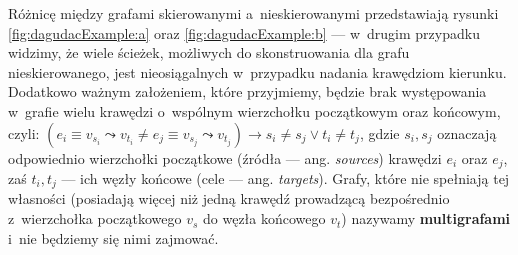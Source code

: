 Różnicę między grafami skierowanymi a~nieskierowanymi przedstawiają rysunki \ref{fig:dagudacExample:a} oraz \ref{fig:dagudacExample:b} --- w~drugim przypadku widzimy, że wiele ścieżek, możliwych do skonstruowania dla grafu nieskierowanego, jest nieosiągalnych w~przypadku nadania krawędziom kierunku.
Dodatkowo ważnym założeniem, które przyjmiemy, będzie brak występowania w~grafie wielu krawędzi o~wspólnym wierzchołku początkowym oraz końcowym, czyli: $\left( e_{i} \equiv v_{s_{i}} \leadsto v_{t_{i}} \neq e_{j} \equiv v_{s_{j}} \leadsto v_{t_{j}} \right) \rightarrow s_{i} \neq s_{j} \vee t_{i} \neq t_{j}$, gdzie $s_{i}, s_{j}$ oznaczają odpowiednio wierzchołki początkowe (źródła --- ang. \textit{sources}) krawędzi $e_{i}$ oraz $e_{j}$, zaś $t_{i}, t_{j}$ --- ich węzły końcowe (cele --- ang. \textit{targets}).
Grafy, które nie spełniają tej własności (posiadają więcej niż jedną krawędź prowadzącą bezpośrednio z~wierzchołka początkowego $v_{s}$ do węzła końcowego $v_{t}$) nazywamy \textbf{multigrafami} i~nie będziemy się nimi zajmować.

